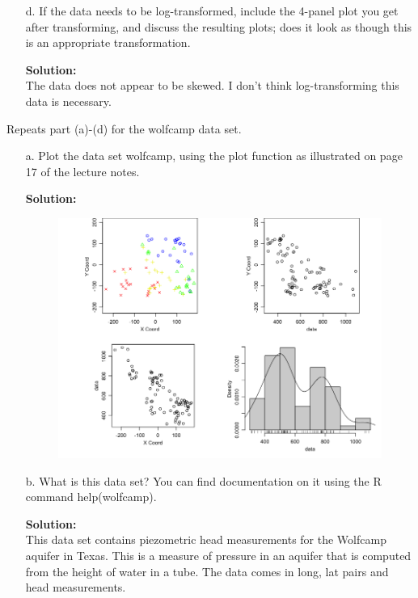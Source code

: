 \documentclass[12pt]{article}
\makeatletter
\theoremstyle{homework}
\newenvironment{exercise}[1]
{\def\@currentlabel{#1}\exercisecore}
{\endexercisecore}
\newcommand{\localhead}[1]{\par\smallskip\noindent\textbf{#1}\nobreak\\}%
\newcommand\solution{\localhead{Solution:}}
\makeatother
\begin{document}
\begin{exercise}{3}
\begin{enumerate}
      \item[d.] If the data needs to be log-transformed, include the 4-panel plot you get after transforming, and discuss the resulting plots; does it look as though this is an appropriate transformation.\\
      \solution The data does not appear to be skewed. I don't think log-transforming this data is necessary. 
      \vspace{.15in}
  \end{enumerate}
\end{exercise}
\vspace{1in}


\begin{exercise}{4} Repeats part (a)-(d) for the wolfcamp data set.\\
  \begin{enumerate}
    \item[a.] Plot the data set wolfcamp, using the plot function as illustrated on page 17 of the lecture notes.\\
    \solution  
    \begin{figure}[H]
      \begin{center}
      \includegraphics[width = \textwidth]{Rplot02.png}
      \end{center}
    \end{figure}
    \item[b.] What is this data set? You can find documentation on it using the R command help(wolfcamp).\\
    \solution This data set contains piezometric head measurements for the Wolfcamp aquifer in Texas. This is a measure of 
    pressure in an aquifer that is computed from the height of water in a tube. The data comes in long, lat pairs and head measurements. 




\end{enumerate}
\end{exercise}
\end{document}
